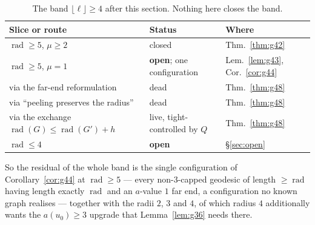 \documentclass[11pt]{article}
\theoremstyle{plain}
\theoremstyle{definition}
\theoremstyle{remark}
\numberwithin{equation}{section}
\newcommand{\rad}{\operatorname{rad}}
\begin{document}
\begin{table}[ht]
\centering
\small
\begin{tabular}{@{}lll@{}}
\toprule
Slice or route & Status & Where \\
\midrule
$\rad \ge 5$, $\mu \ge 2$ & closed & Thm.~\ref{thm:g42} \\
$\rad \ge 5$, $\mu = 1$ & \textbf{open}; one configuration & Lem.~\ref{lem:g43},
   Cor.~\ref{cor:g44} \\
\quad via the far-end reformulation & dead & Thm.~\ref{thm:g48} \\
\quad via ``peeling preserves the radius'' & dead & Thm.~\ref{thm:g48} \\
\quad via the exchange $\rad(G)\le \rad(G')+h$ & live, tight-controlled by $Q$ &
   Thm.~\ref{thm:g48} \\
$\rad \le 4$ & \textbf{open} & \S\ref{sec:open} \\
\bottomrule
\end{tabular}
\caption{The band $\lfloor\ell\rfloor\ge 4$ after this section. Nothing here closes the band.}
\label{tab:pocket2}
\end{table}

So the residual of the whole band is the single configuration of Corollary~\ref{cor:g44} at
$\rad \ge 5$ --- every non-$3$-capped geodesic of length $\ge \rad$ having length exactly
$\rad$ and an $a$-value $1$ far end, a configuration no known graph realises --- together with
the radii $2$, $3$ and $4$, of which radius $4$ additionally wants the $a(u_0)\ge 3$ upgrade
that Lemma~\ref{lem:g36} needs there.
\end{document}
